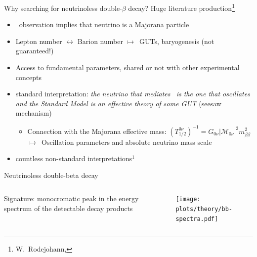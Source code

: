 \documentclass[10pt,aspectratio=169]{beamer}
\newcommand{\arrow}{$\longmapsto$}
\begin{document}
\begin{frame}{Why searching for neutrinoless double-$\beta$ decay?}
  Huge literature production\footnote{W.~Rodejohann, }
  \begin{itemize}
    \item \onbb\ observation implies that neutrino is a \alert{Majorana particle}
    \item Lepton number $\longleftrightarrow$ Barion number \arrow\
      \alert{GUTs}, \alert{baryogenesis} (not guaranteed!)
    \item Access to fundamental parameters, shared or not with other
      experimental concepts
    \item \alert{standard interpretation}: \emph{the neutrino that mediates
      \onbb\ is the one that oscillates and the Standard Model is an effective
      theory of some GUT} (seesaw mechanism)
    \begin{itemize}
      \item Connection with the Majorana effective mass:
        $(T^{0\nu}_{1/2})^{-1}=G_{0\nu} |\mathcal{M}_{0\nu}|^2 m_{\beta\beta}^2$
        \arrow\ Oscillation parameters and absolute neutrino mass scale
    \end{itemize}
  \item countless non-standard interpretations$^1$
  \end{itemize}
\end{frame}
\begin{frame}{Neutrinoless double-beta decay}
  \begin{columns}
    \begin{column}{0.5\textwidth}
      Signature: monocromatic peak in the energy spectrum of the detectable decay products
    \end{column}
    \begin{column}{0.5\textwidth}
      \begin{center}
        \texttt{[image: plots/theory/bb-spectra.pdf]}
      \end{center}
    \end{column}
  \end{columns}
\end{frame}
\end{document}
